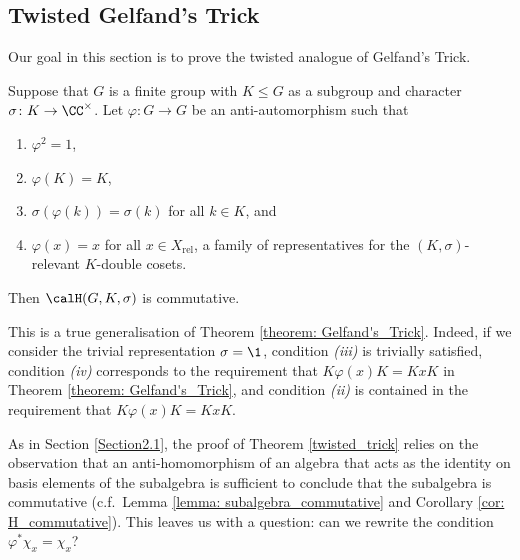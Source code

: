 
\subsection{Twisted Gelfand's Trick}\label{Section2.3}
Our goal in this section is to prove the twisted analogue of Gelfand's Trick.
\begin{thm}\label{twisted_trick}
    Suppose that $G$ is a finite group with $K\leq G$ as a subgroup and character $\sigma\colon K\to\CC^\times$.
    Let $\varphi\colon G\to G$ be an anti-automorphism such that
    \begin{enumerate}[\itshape(i)]
        \item $\varphi^2=1$,
        \item $\varphi(K)=K$,
        \item $\sigma(\varphi(k))=\sigma(k)$ for all $k\in K$, and
        \item $\varphi(x) = x$ for all $x\in X_\mathrm{rel}$, a family of representatives for the $(K,\sigma)$-relevant $K$-double cosets.
    \end{enumerate}
    Then $\calH(G,K,\sigma)$ is commutative.
\end{thm}
This is a true generalisation of Theorem \ref{theorem: Gelfand's_Trick}.
Indeed, if we consider the trivial representation $\sigma=\1$, condition {\itshape(iii)} is trivially satisfied, condition {\itshape(iv)} corresponds to the requirement that $K\varphi(x)K=KxK$ in Theorem \ref{theorem: Gelfand's_Trick}, and condition {\itshape(ii)} is contained in the requirement that $K\varphi(x)K=KxK$.

As in Section \ref{Section2.1}, the proof of Theorem \ref{twisted_trick} relies on the observation that an anti-homomorphism of an algebra that acts as the identity on basis elements of the subalgebra is sufficient to conclude that the subalgebra is commutative (c.f.\ Lemma \ref{lemma: subalgebra_commutative} and Corollary \ref{cor: H_commutative}).
This leaves us with a question: can we rewrite the condition $\varphi^\ast \chi_x = \chi_x$?


